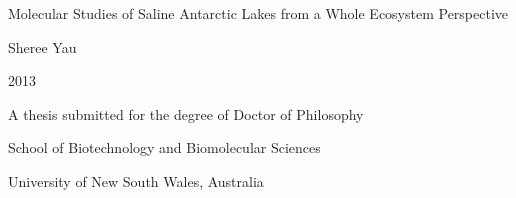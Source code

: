 \begin{titlepage}
\begin{center}
\vspace*{1in}
\LARGE{Molecular Studies of Saline Antarctic Lakes from a Whole Ecosystem Perspective}
\par
\vspace{1.5in}
\large{Sheree Yau}
\par
\vspace{0.5in}
\large{2013}
\par
\vfill
A thesis submitted for the degree of Doctor of Philosophy
\par
\vspace{0.5in}
School of Biotechnology and Biomolecular Sciences
\par
University of New South Wales, Australia
\par
\vspace{0.5in}
\end{center}
\end{titlepage}
